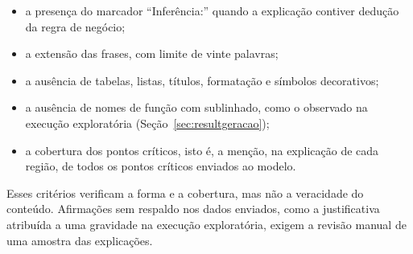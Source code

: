 \documentclass[
    12pt,                   %
    openright,              %
    oneside,                %
    a4paper,                %
    sumario=tradicional,    %
    english,                %
    brazil,                 %
    ]{abntex2}
\begin{document}
\begin{itemize}
  \item a presença do marcador \enquote{Inferência:} quando a explicação contiver dedução da regra de negócio;
  \item a extensão das frases, com limite de vinte palavras;
  \item a ausência de tabelas, listas, títulos, formatação e símbolos decorativos;
  \item a ausência de nomes de função com sublinhado, como o observado na execução exploratória (Seção~\ref{sec:resultgeracao});
  \item a cobertura dos pontos críticos, isto é, a menção, na explicação de cada região, de todos os pontos críticos enviados ao modelo.
\end{itemize}

Esses critérios verificam a forma e a cobertura, mas não a veracidade do conteúdo. Afirmações sem respaldo nos dados enviados, como a justificativa atribuída a uma gravidade na execução exploratória, exigem a revisão manual de uma amostra das explicações.




\end{document}
